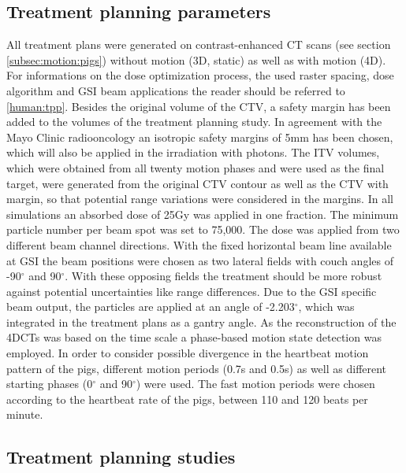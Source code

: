 \documentclass[type=dr, dr=rernat, accentcolor=tud7b,colorbacktitle, bigchapter, openright, twoside, 12pt ]{tudthesis}
\begin{document}
\subsection{Treatment planning parameters}

All treatment plans were generated on contrast-enhanced CT scans (see section \ref{subsec:motion:pigs}) without motion (3D, static) as well as 
with motion (4D).  For informations on the dose optimization process, the used raster spacing, dose 
algorithm and GSI beam applications the reader should be referred to \ref{human:tpp}.\newline
\newline
Besides the original volume of the CTV, a safety margin has been added to the volumes of the treatment planning study. In agreement with the 
Mayo Clinic radiooncology an isotropic safety margins of 5mm has been chosen, which will also be applied in the irradiation with photons. 
The ITV volumes\cite{Gra12}, which were obtained from all twenty motion phases and were used as the final target, were generated from the 
original CTV contour as well as the CTV with margin, so that potential range variations were considered in the margins.
\newpage
In all simulations an absorbed dose of 25Gy was applied in one fraction. The minimum particle number per beam spot was set to 75,000.
The dose was applied from two different beam channel directions. With the fixed horizontal beam line available at GSI the beam positions 
were chosen as two lateral fields with couch angles of -90$^{\circ}$ and 90$^{\circ}$. With these opposing fields the treatment should be 
more robust against potential uncertainties like range differences. Due to the GSI specific beam output, the particles are applied at an 
angle of -2.203$^{\circ}$, which was integrated in the treatment plans as a gantry angle.\newline
\newline
As the reconstruction of the 4DCTs was based on the time scale a phase-based motion state detection was employed. 
In order to consider possible divergence in the heartbeat motion pattern of the pigs, different motion periods (0.7s and 0.5s) as well as 
different starting phases (0$^{\circ}$ and 90$^{\circ}$) were used. The fast motion periods were chosen according to the  
heartbeat rate of the pigs, between 110 and 120 beats per minute.


\subsection{Treatment planning studies}
\end{document}
